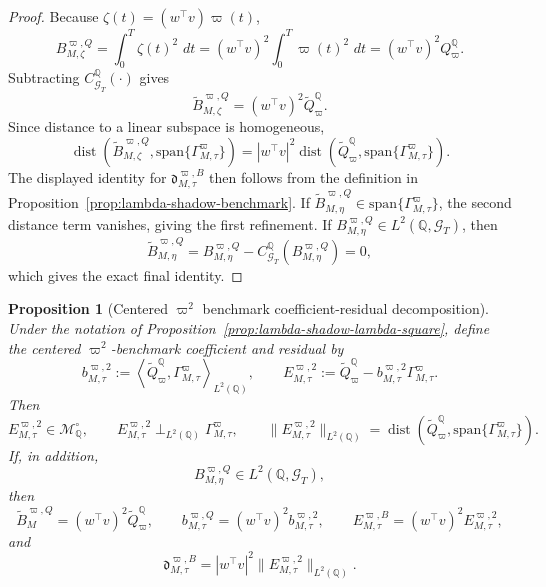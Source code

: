 \documentclass[11pt,a4paper]{amsart}
\theoremstyle{plain}
\newtheorem{proposition}[theorem]{Proposition}
\theoremstyle{definition}
\theoremstyle{remark}
\DeclareMathOperator{\dist}{dist}
\newcommand{\QQ}{\mathbb{Q}}
\newcommand{\cG}{\mathcal{G}}
\newcommand{\cM}{\mathcal{M}}
\newcommand{\dd}{\,d}
\begin{document}
\begin{proof}
Because \(\zeta(t)=(w^\top v)\varpi(t)\),
\[
        B_{M,\zeta}^{\varpi,Q}
        =
        \int_0^T \zeta(t)^2\,\dd t
        =
        (w^\top v)^2\int_0^T \varpi(t)^2\,\dd t
        =
        (w^\top v)^2 Q_{\varpi}^\QQ.
\]
Subtracting \(C_{\cG_T}^\QQ(\cdot)\) gives
\[
        \widetilde B_{M,\zeta}^{\varpi,Q}
        =
        (w^\top v)^2\widetilde Q_{\varpi}^\QQ.
\]
Since distance to a linear subspace is homogeneous,
\[
        \dist\!\left(
                \widetilde B_{M,\zeta}^{\varpi,Q},
                \mathrm{span}\{\Gamma_{M,\tau}^\varpi\}
        \right)
        =
        |w^\top v|^2
        \dist\!\left(
                \widetilde Q_{\varpi}^\QQ,
                \mathrm{span}\{\Gamma_{M,\tau}^\varpi\}
        \right).
\]
The displayed identity for \(\mathfrak d_{M,\tau}^{\varpi,B}\) then follows from the definition
in Proposition~\ref{prop:lambda-shadow-benchmark}.  If
\(\widetilde B_{M,\eta}^{\varpi,Q}\in \mathrm{span}\{\Gamma_{M,\tau}^\varpi\}\), the second
distance term vanishes, giving the first refinement.  If
\(B_{M,\eta}^{\varpi,Q}\in L^2(\QQ,\cG_T)\), then
\[
        \widetilde B_{M,\eta}^{\varpi,Q}
        =
        B_{M,\eta}^{\varpi,Q}-C_{\cG_T}^\QQ(B_{M,\eta}^{\varpi,Q})
        =
        0,
\]
which gives the exact final identity.
\end{proof}

\begin{proposition}[Centered \(\varpi^2\) benchmark coefficient-residual decomposition]\label{prop:lambda-shadow-lambda-square-coeff}
Under the notation of Proposition~\ref{prop:lambda-shadow-lambda-square}, define the centered
\(\varpi^2\)-benchmark coefficient and residual by
\[
        b_{M,\tau}^{\varpi,2}
        :=
        \left\langle
                \widetilde Q_{\varpi}^\QQ,
                \Gamma_{M,\tau}^\varpi
        \right\rangle_{L^2(\QQ)},
        \qquad
        E_{M,\tau}^{\varpi,2}
        :=
        \widetilde Q_{\varpi}^\QQ
        -
        b_{M,\tau}^{\varpi,2}\Gamma_{M,\tau}^\varpi.
\]
Then
\[
        E_{M,\tau}^{\varpi,2}\in \cM_\QQ^\circ,
        \qquad
        E_{M,\tau}^{\varpi,2}
        \perp_{L^2(\QQ)}
        \Gamma_{M,\tau}^\varpi,
        \qquad
        \|E_{M,\tau}^{\varpi,2}\|_{L^2(\QQ)}
        =
        \dist\!\left(
                \widetilde Q_{\varpi}^\QQ,
                \mathrm{span}\{\Gamma_{M,\tau}^\varpi\}
        \right).
\]
If, in addition,
\[
        B_{M,\eta}^{\varpi,Q}\in L^2(\QQ,\cG_T),
\]
then
\[
        \widetilde B_{M}^{\varpi,Q}
        =
        (w^\top v)^2\widetilde Q_{\varpi}^\QQ,
        \qquad
        b_{M,\tau}^{\varpi,Q}
        =
        (w^\top v)^2 b_{M,\tau}^{\varpi,2},
        \qquad
        E_{M,\tau}^{\varpi,B}
        =
        (w^\top v)^2 E_{M,\tau}^{\varpi,2},
\]
and
\[
        \mathfrak d_{M,\tau}^{\varpi,B}
        =
        |w^\top v|^2\|E_{M,\tau}^{\varpi,2}\|_{L^2(\QQ)}.
\]
\end{proposition}
\end{document}
